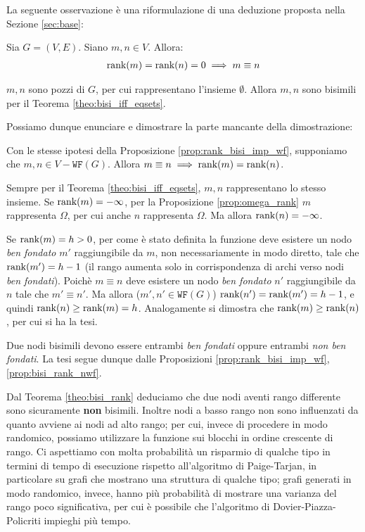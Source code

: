 La seguente osservazione è una riformulazione di una deduzione proposta nella Sezione \ref{sec:base}:
\begin{observation}
    Sia $G = (V,E)$. Siano $m,n \in V$. Allora:
    \begin{gather*}
        \textup{rank}(m) = \textup{rank}(n) = 0 \implies m \equiv n
    \end{gather*}
\end{observation}
\begin{proof2}
    $m,n$ sono pozzi di $G$, per cui rappresentano l'insieme $\emptyset$. Allora $m,n$ sono bisimili per il Teorema \ref{theo:bisi_iff_eqsets}.
\end{proof2}

Possiamo dunque enunciare e dimostrare la parte mancante della dimostrazione:
\begin{proposition}
    \label{prop:bisi_rank_nwf}
    Con le stesse ipotesi della Proposizione \ref{prop:rank_bisi_imp_wf}, supponiamo che $m,n \in V - \texttt{WF}(G)$. Allora $m \equiv n \implies \textup{rank}(m) = \textup{rank}(n)$.
\end{proposition}
\begin{proof2}
    Sempre per il Teorema \ref{theo:bisi_iff_eqsets}, $m,n$ rappresentano lo stesso insieme. Se $\textup{rank}(m) = -\infty$, per la Proposizione \ref{prop:omega_rank} $m$ rappresenta $\Omega$, per cui anche $n$ rappresenta $\Omega$. Ma allora $\textup{rank}(n) = -\infty$.

    Se $\textup{rank}(m) = h > 0$, per come è stato definita la funzione \rankfunc deve esistere un nodo \emph{ben fondato} $m'$ raggiungibile da $m$, non necessariamente in modo diretto, tale che $\textup{rank}(m') = h-1$ (il rango aumenta solo in corrispondenza di archi verso nodi \emph{ben fondati}). Poichè $m \equiv n$ deve esistere un nodo \emph{ben fondato} $n'$ raggiungibile da $n$ tale che $m' \equiv n'$. Ma allora ($m',n' \in \texttt{WF}(G)$) $\textup{rank}(n') = \textup{rank}(m') = h-1$, e quindi $\textup{rank}(n) \geq \textup{rank}(m) = h$. Analogamente si dimostra che $\textup{rank}(m) \geq \textup{rank}(n)$, per cui si ha la tesi.
\end{proof2}

\begin{proof2}
    Due nodi bisimili devono essere entrambi \emph{ben fondati} oppure entrambi \emph{non ben fondati}. La tesi segue dunque dalle Proposizioni \ref{prop:rank_bisi_imp_wf}, \ref{prop:bisi_rank_nwf}.
\end{proof2}

Dal Teorema \ref{theo:bisi_rank} deduciamo che due nodi aventi rango differente sono sicuramente \textbf{non} bisimili. Inoltre nodi a basso rango non sono influenzati da quanto avviene ai nodi ad alto rango; per cui, invece di procedere in modo randomico, possiamo utilizzare la funzione \splitfunc sui blocchi in ordine crescente di rango. Ci aspettiamo con molta probabilità un risparmio di qualche tipo in termini di tempo di esecuzione rispetto all'algoritmo di Paige-Tarjan, in particolare su grafi che mostrano una struttura di qualche tipo; grafi generati in modo randomico, invece, hanno più probabilità di mostrare una varianza del rango poco significativa, per cui è possibile che l'algoritmo di Dovier-Piazza-Policriti impieghi più tempo.


